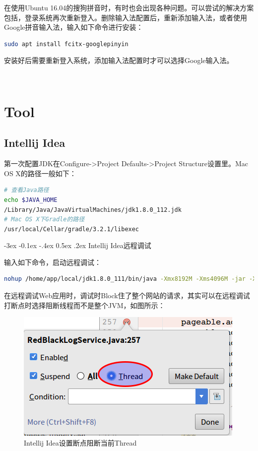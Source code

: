 \documentclass[12pt]{book}
\makeatletter
\numberwithin{dummy}{section}
\theoremstyle{ocrenumbox}
\theoremstyle{blacknumex}
\theoremstyle{blacknumbox}
\theoremstyle{ocrenum}
\renewcommand{\subsection}{\@startsection {subsection}{2}{\z@}
	{-3ex \@plus -0.1ex \@minus -.4ex}
	{0.5ex \@plus.2ex }
	{\normalfont\sffamily\bfseries}}
\makeatother
\begin{document}
在使用Ubuntu 16.04的搜狗拼音时，有时也会出现各种问题。可以尝试的解决方案包括，登录系统再次重新登入。删除输入法配置后，重新添加输入法，或者使用Google拼音输入法，输入如下命令进行安装：

\begin{lstlisting}[language=Bash]
sudo apt install fcitx-googlepinyin
\end{lstlisting}

安装好后需要重新登入系统，添加输入法配置时才可以选择Google输入法。

\newpage
~\vfil 

\part{Tool}

\newpage

\chapter{Intellij Idea}

第一次配置JDK在Configure->Project Defaults->Project Structure设置里。Mac OS X的路径一般如下：

\begin{lstlisting}[language=Bash]
# 查看Java路径
echo $JAVA_HOME
/Library/Java/JavaVirtualMachines/jdk1.8.0_112.jdk
# Mac OS X下Gradle的路径
/usr/local/Cellar/gradle/3.2.1/libexec
\end{lstlisting}

\subsection{Intellij Idea远程调试}

输入如下命令，启动远程调试：

\begin{lstlisting}[language=Bash]
nohup /home/app/local/jdk1.8.0_111/bin/java -Xmx8192M -Xms4096M -jar -Xdebug -Xrunjdwp:transport=dt_socket,suspend=n,server=y,address=5005 /home/app/backend/credit-system-web-boot-1.1.9.jar --spring.config.location=application.properties>/dev/null &
\end{lstlisting}

在远程调试Web应用时，调试时Block住了整个网站的请求，其实可以在远程调试打断点时选择阻断线程而不是整个JVM，如图所示：

\begin{figure}[htbp]
	\centering
	\includegraphics[scale=0.6]{intellijideabreakthread.png}
	\caption{Intellij Idea设置断点阻断当前Thread}
	\label{fig:intellijideabreakthread}
\end{figure}
\end{document}
